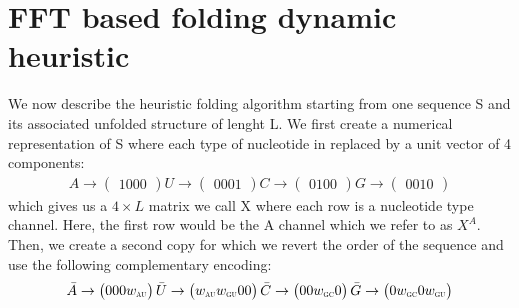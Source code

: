 \documentclass[a4paper,12pt]{article}
\begin{document}
\section{FFT based folding dynamic heuristic}
\label{sec:org4a0ce0a}
We now describe the heuristic folding algorithm starting from one sequence S and
its associated unfolded structure of lenght L. We first create a numerical
representation of S where each type of nucleotide in replaced by a unit vector
of 4 components:
\begin{equation}
\begin{split}
A \rightarrow \begin{pmatrix} 1 0 0 0 \end{pmatrix}
U \rightarrow \begin{pmatrix} 0 0 0 1 \end{pmatrix}
C \rightarrow \begin{pmatrix} 0 1 0 0 \end{pmatrix}
G \rightarrow \begin{pmatrix} 0 0 1 0 \end{pmatrix}
\end{split}
\end{equation}
which gives us a \(4 \times L\) matrix we call X where each row is a nucleotide
type channel. Here, the first row would be the A channel which we refer to as
\(X^A\). Then, we create a second copy for which we revert the order of the
sequence and use the following complementary encoding:
\begin{equation}
\begin{split}
\bar{A} \rightarrow \begin{pmatrix} 0 0 0 w_{\scalebox{0.5}{AU}} \end{pmatrix}
\bar{U} \rightarrow \begin{pmatrix} w_{\scalebox{0.5}{AU}} w_{\scalebox{0.5}{GU}} 0 0 \end{pmatrix}
\bar{C} \rightarrow \begin{pmatrix} 0 0 w_{\scalebox{0.5}{GC}} 0 \end{pmatrix}
\bar{G} \rightarrow \begin{pmatrix} 0 w_{\scalebox{0.5}{GC}} 0 w_{\scalebox{0.5}{GU}} \end{pmatrix}
\end{split}
\end{equation}
\end{document}
